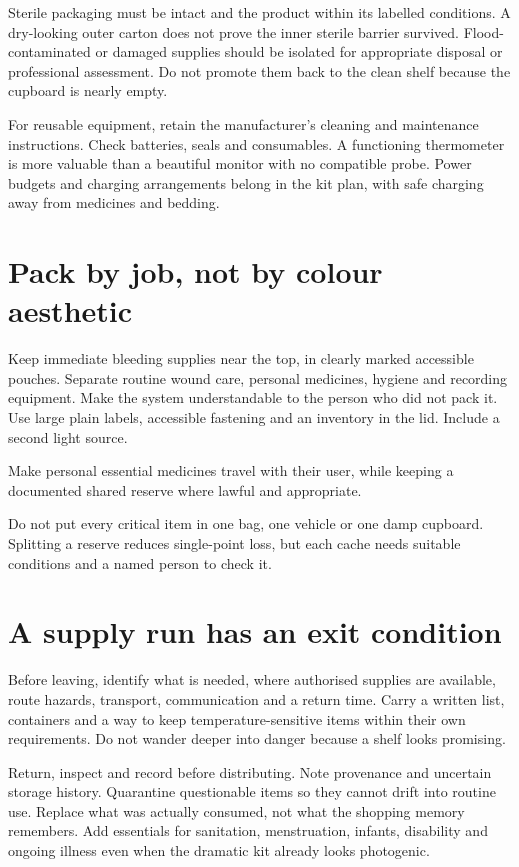 \documentclass[10pt,openright]{book}
\begin{document}
Sterile packaging must be intact and the product within its labelled conditions. A dry-looking outer carton does not prove the inner sterile barrier survived. Flood-contaminated or damaged supplies should be isolated for appropriate disposal or professional assessment. Do not promote them back to the clean shelf because the cupboard is nearly empty.

For reusable equipment, retain the manufacturer's cleaning and maintenance instructions. Check batteries, seals and consumables. A functioning thermometer is more valuable than a beautiful monitor with no compatible probe. Power budgets and charging arrangements belong in the kit plan, with safe charging away from medicines and bedding.

\section*{Pack by job, not by colour aesthetic}
Keep immediate bleeding supplies near the top, in clearly marked accessible pouches. Separate routine wound care, personal medicines, hygiene and recording equipment. Make the system understandable to the person who did not pack it. Use large plain labels, accessible fastening and an inventory in the lid. Include a second light source.

Make personal essential medicines travel with their user, while keeping a documented shared reserve where lawful and appropriate.

Do not put every critical item in one bag, one vehicle or one damp cupboard. Splitting a reserve reduces single-point loss, but each cache needs suitable conditions and a named person to check it.

\section*{A supply run has an exit condition}
Before leaving, identify what is needed, where authorised supplies are available, route hazards, transport, communication and a return time. Carry a written list, containers and a way to keep temperature-sensitive items within their own requirements. Do not wander deeper into danger because a shelf looks promising.

Return, inspect and record before distributing. Note provenance and uncertain storage history. Quarantine questionable items so they cannot drift into routine use. Replace what was actually consumed, not what the shopping memory remembers. Add essentials for sanitation, menstruation, infants, disability and ongoing illness even when the dramatic kit already looks photogenic.
\end{document}
